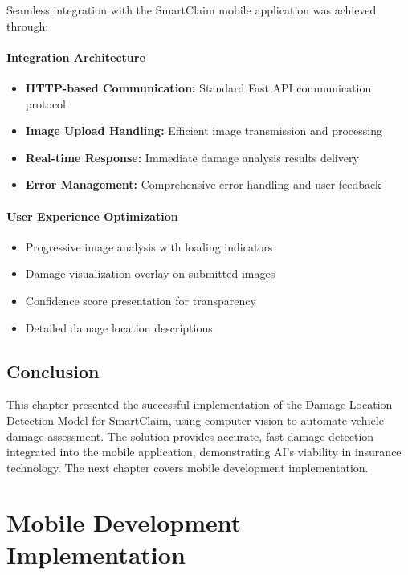 \documentclass[12pt,a4paper]{report}
\begin{document}
Seamless integration with the SmartClaim mobile application was achieved through:

\subsubsection{Integration Architecture}
\begin{itemize}
    \item \textbf{HTTP-based Communication:} Standard Fast API communication protocol
    \item \textbf{Image Upload Handling:} Efficient image transmission and processing
    \item \textbf{Real-time Response:} Immediate damage analysis results delivery
    \item \textbf{Error Management:} Comprehensive error handling and user feedback
\end{itemize}

\subsubsection{User Experience Optimization}
\begin{itemize}
    \item Progressive image analysis with loading indicators
    \item Damage visualization overlay on submitted images
    \item Confidence score presentation for transparency
    \item Detailed damage location descriptions
\end{itemize}



\section*{Conclusion}

This chapter presented the successful implementation of the Damage Location Detection Model for SmartClaim, using computer vision to automate vehicle damage assessment. The solution provides accurate, fast damage detection integrated into the mobile application, demonstrating AI's viability in insurance technology. The next chapter covers mobile development implementation.



\chapter{Mobile Development Implementation}
\end{document}
